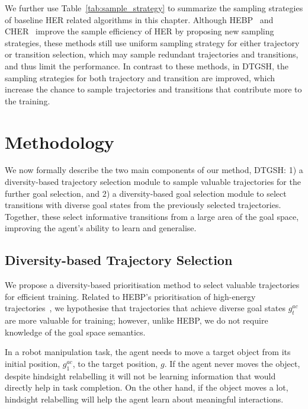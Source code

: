 We further use Table~\ref{tab:sample_strategy} to summarize the sampling strategies of baseline HER related algorithms in this chapter. Although HEBP~\cite{zhao2018energy} and CHER~\cite{fang2019curriculum} improve the sample efficiency of HER by proposing new sampling strategies, these methods still use uniform sampling strategy for either trajectory or transition selection, which may sample redundant trajectories and transitions, and thus limit the performance. In contrast to these methods, in DTGSH, the sampling strategies for both trajectory and transition are improved, which increase the chance to sample trajectories and transitions that contribute more to the training.

\section{Methodology}
We now formally describe the two main components of our method, DTGSH: 1) a diversity-based trajectory selection module to sample valuable trajectories for the further goal selection, and 2) a diversity-based goal selection module to select transitions with diverse goal states from the previously selected trajectories. Together, these select informative transitions from a large area of the goal space, improving the agent's ability to learn and generalise.

\subsection{Diversity-based Trajectory Selection}
We propose a diversity-based prioritisation method to select valuable trajectories for efficient training. Related to HEBP's prioritisation of high-energy trajectories~\cite{zhao2018energy}, we hypothesise that trajectories that achieve diverse goal states $g^{ac}_{t}$ are more valuable for training; however, unlike HEBP, we do not require knowledge of the goal space semantics.

In a robot manipulation task, the agent needs to move a target object from its initial position, $g^{ac}_{1}$, to the target position, $g$. If the agent never moves the object, despite hindsight relabelling it will not be learning information that would directly help in task completion. On the other hand, if the object moves a lot, hindsight relabelling will help the agent learn about meaningful interactions.


